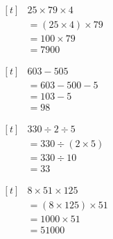 \documentclass[UTF8]{ctexart}
\newcommand{\cell}[1]{%
  \begin{minipage}[t][49mm][t]{0.315\textwidth}%
    \vspace{0pt}%
    \linespread{1}\zihao{3}%
    #1%
  \end{minipage}%
}
\newcommand{\sheetrow}[3]{%
  \noindent\cell{#1}\hfill\cell{#2}\hfill\cell{#3}\par
  \nointerlineskip
}
\begin{document}
{\(\begin{aligned}[t]
& 25\times 79\times 4 \\
& = (25\times 4)\times 79 \\
& = 100\times 79 \\
& = 7900
\end{aligned}\)}
\sheetrow
{\(\begin{aligned}[t]
& 603-505 \\
& = 603-500-5 \\
& = 103-5 \\
& = 98
\end{aligned}\)}
{\(\begin{aligned}[t]
& 330\div 2\div 5 \\
& = 330\div (2\times 5) \\
& = 330\div 10 \\
& = 33
\end{aligned}\)}
{\(\begin{aligned}[t]
& 8\times 51\times 125 \\
& = (8\times 125)\times 51 \\
& = 1000\times 51 \\
& = 51000
\end{aligned}\)}
\end{document}
